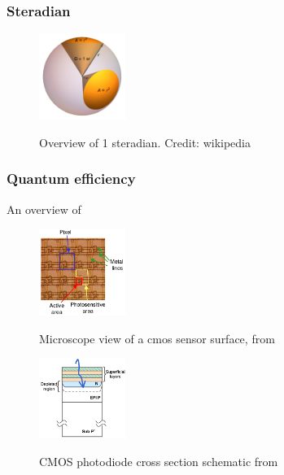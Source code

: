 \documentclass{article}
\begin{document}
    \subsubsection{Steradian}
      \begin{figure}[H]
	\centering
	\includegraphics[width=0.25\textwidth]{../../figures/Solid_Angle_1_Steradian.png}\\
	\caption{Overview of 1 steradian. Credit: wikipedia}
	\label{fig:steradian}
      \end{figure}
      
    \subsubsection{Quantum efficiency}

    An overview of 
    
    \begin{figure}[H]
      \centering
      \includegraphics[width=0.25\textwidth]{../../figures/cmos_pixel_microscope.png}\\
      \caption{Microscope view of a cmos sensor surface, from \cite{Estribeau_2005}}
      \label{fig:cmos_pixel_microscope}
    \end{figure}
    
    \begin{figure}[H]
      \centering
      \includegraphics[width=0.25\textwidth]{../../figures/cmos_photodiode_cross_section.png}\\
      \caption{CMOS photodiode cross section schematic from \cite{Estribeau_2005}}
      \label{fig:cmos_photodiode_cross_section}
    \end{figure}
\end{document}
